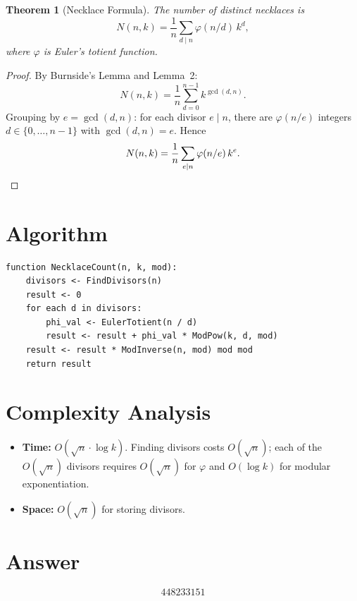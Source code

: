 \documentclass[11pt]{article}
\newtheorem{theorem}{Theorem}
\begin{document}
\begin{theorem}[Necklace Formula]
The number of distinct necklaces is
\[
N(n,k) = \frac{1}{n}\sum_{d \mid n} \varphi(n/d)\, k^d,
\]
where $\varphi$ is Euler's totient function.
\end{theorem}

\begin{proof}
By Burnside's Lemma and Lemma~2:
\[
N(n,k) = \frac{1}{n}\sum_{d=0}^{n-1} k^{\gcd(d,n)}.
\]
Grouping by $e = \gcd(d,n)$: for each divisor $e \mid n$, there are $\varphi(n/e)$ integers $d \in \{0,\ldots,n-1\}$ with $\gcd(d,n)=e$. Hence
\[
N(n,k) = \frac{1}{n}\sum_{e \mid n} \varphi(n/e)\, k^e. \qedhere
\]
\end{proof}

\section{Algorithm}

\begin{verbatim}
function NecklaceCount(n, k, mod):
    divisors <- FindDivisors(n)
    result <- 0
    for each d in divisors:
        phi_val <- EulerTotient(n / d)
        result <- result + phi_val * ModPow(k, d, mod)
    result <- result * ModInverse(n, mod) mod mod
    return result
\end{verbatim}

\section{Complexity Analysis}

\begin{itemize}
\item \textbf{Time:} $O(\sqrt{n} \cdot \log k)$. Finding divisors costs $O(\sqrt{n})$; each of the $O(\sqrt{n})$ divisors requires $O(\sqrt{n})$ for $\varphi$ and $O(\log k)$ for modular exponentiation.
\item \textbf{Space:} $O(\sqrt{n})$ for storing divisors.
\end{itemize}

\section{Answer}

\[
\boxed{448233151}
\]
\end{document}
